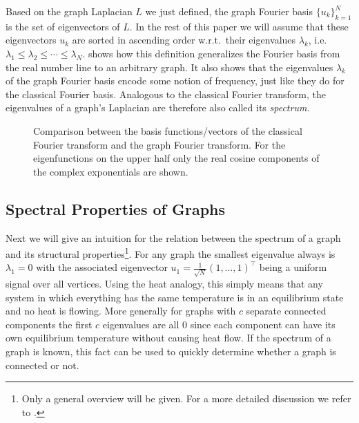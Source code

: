 Based on the graph Laplacian $L$ we just defined, the graph Fourier basis ${\{ u_k \}}_{k = 1}^{N}$ is the set of eigenvectors of $L$.
In the rest of this paper we will assume that these eigenvectors $u_k$ are sorted in ascending order w.r.t.\  their eigenvalues $\lambda_k$, i.e.\  $\lambda_1 \leq \lambda_2 \leq \cdots \leq \lambda_N$.
 shows how this definition generalizes the Fourier basis from the real number line to an arbitrary graph.
It also shows that the eigenvalues $\lambda_k$ of the graph Fourier basis encode some notion of frequency, just like they do for the classical Fourier basis.
Analogous to the classical Fourier transform, the eigenvalues of a graph's Laplacian are therefore also called its \textit{spectrum}.
\begin{figure}[ht]
	\centering
	\caption{%
		Comparison between the basis functions/vectors of the classical Fourier transform and the graph Fourier transform.
		For the eigenfunctions on the upper half only the real cosine components of the complex exponentials are shown.
	}\label{fig:sgt:graphFourier}
\end{figure}

\subsection{Spectral Properties of Graphs}%
\label{sec:sgt:spectrum}

Next we will give an intuition for the relation between the spectrum of a graph and its structural properties\footnote{%
	Only a general overview will be given. For a more detailed discussion we refer to \citet{Shuman2013}.
}.
For any graph the smallest eigenvalue always is $\lambda_1 = 0$ with the associated eigenvector $u_1 = \frac{1}{\sqrt{N}} {(1, \dots, 1)}^\top$ being a uniform signal over all vertices.
Using the heat analogy, this simply means that any system in which everything has the same temperature is in an equilibrium state and no heat is flowing.
More generally for graphs with $c$ separate connected components the first $c$ eigenvalues are all $0$ since each component can have its own equilibrium temperature without causing heat flow.
If the spectrum of a graph is known, this fact can be used to quickly determine whether a graph is connected or not.

